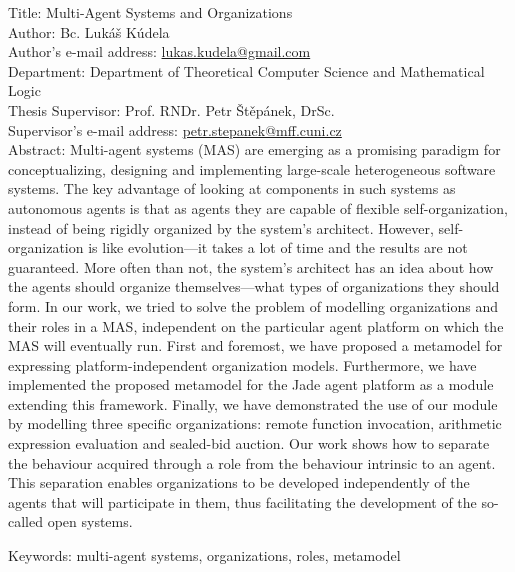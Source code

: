 
Title: Multi-Agent Systems and Organizations\\
Author: Bc. Lukáš Kúdela\\
Author's e-mail address: \url{lukas.kudela@gmail.com}\\
Department: Department of Theoretical Computer Science and Mathematical Logic\\
Thesis Supervisor: Prof. RNDr. Petr Štěpánek, DrSc.\\
Supervisor's e-mail address: \url{petr.stepanek@mff.cuni.cz}\\

Abstract: Multi-agent systems (MAS) are emerging as a promising paradigm for conceptualizing, designing and implementing large-scale heterogeneous software systems.
The key advantage of looking at components in such systems as autonomous agents is that as agents they are capable of flexible self-organization, instead of being rigidly organized by the system's architect.
However, self-organization is like evolution---it takes a lot of time and the results are not guaranteed.
More often than not, the system's architect has an idea about how the agents should organize themselves---what types of organizations they should form.
In our work, we tried to solve the problem of modelling organizations and their roles in a MAS, independent on the particular agent platform on which the MAS will eventually run.
First and foremost, we have proposed a metamodel for expressing platform-independent organization models.
Furthermore, we have implemented the proposed metamodel for the Jade agent platform as a module extending this framework.
Finally, we have demonstrated the use of our module by modelling three specific organizations: remote function invocation, arithmetic expression evaluation and sealed-bid auction.
Our work shows how to separate the behaviour acquired through a role from the behaviour intrinsic to an agent. 
This separation enables organizations to be developed independently of the agents that will participate in them, thus facilitating the development of the so-called open systems.

Keywords: multi-agent systems, organizations, roles, metamodel